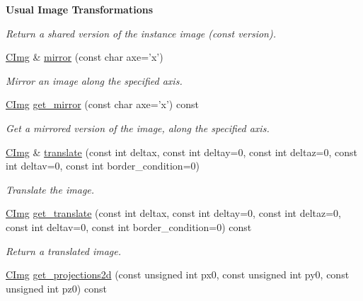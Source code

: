 \begin{Indent}{\bf Usual Image Transformations}
\begin{DoxyCompactItemize}
\begin{DoxyCompactList}\small\item\em Return a shared version of the instance image (const version). \item\end{DoxyCompactList}\item 
\hyperlink{structcimg__library_1_1_c_img}{CImg} \& \hyperlink{structcimg__library_1_1_c_img_a0dddf2bd640a2b4c8a1218bf73f116bb}{mirror} (const char axe='x')
\begin{DoxyCompactList}\small\item\em Mirror an image along the specified axis. \item\end{DoxyCompactList}\item 
\hyperlink{structcimg__library_1_1_c_img}{CImg} \hyperlink{structcimg__library_1_1_c_img_aa30247a4338d50b394c47b3a7eeeab48}{get\_\-mirror} (const char axe='x') const 
\begin{DoxyCompactList}\small\item\em Get a mirrored version of the image, along the specified axis. \item\end{DoxyCompactList}\item 
\hyperlink{structcimg__library_1_1_c_img}{CImg} \& \hyperlink{structcimg__library_1_1_c_img_acc1fc108afa5fcd0f334ba0c854a5481}{translate} (const int deltax, const int deltay=0, const int deltaz=0, const int deltav=0, const int border\_\-condition=0)
\begin{DoxyCompactList}\small\item\em Translate the image. \item\end{DoxyCompactList}\item 
\hyperlink{structcimg__library_1_1_c_img}{CImg} \hyperlink{structcimg__library_1_1_c_img_af8c9f6ca06e378ada0bfd7516ae4b69d}{get\_\-translate} (const int deltax, const int deltay=0, const int deltaz=0, const int deltav=0, const int border\_\-condition=0) const 
\begin{DoxyCompactList}\small\item\em Return a translated image. \item\end{DoxyCompactList}\item 
\hypertarget{structcimg__library_1_1_c_img_ae8369d9edb2ba3f79a64a8e940b921ed}{
\hyperlink{structcimg__library_1_1_c_img}{CImg} \hyperlink{structcimg__library_1_1_c_img_ae8369d9edb2ba3f79a64a8e940b921ed}{get\_\-projections2d} (const unsigned int px0, const unsigned int py0, const unsigned int pz0) const }
\label{structcimg__library_1_1_c_img_ae8369d9edb2ba3f79a64a8e940b921ed}


\end{DoxyCompactItemize}
\end{Indent}
